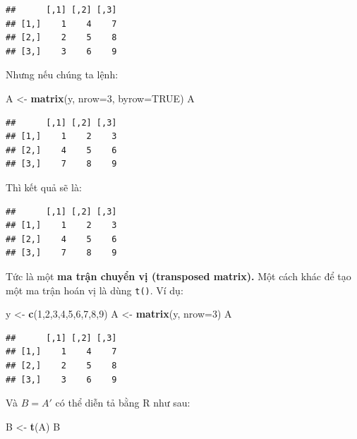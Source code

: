 \documentclass[
]{book}
\newenvironment{Shaded}{\begin{snugshade}}{\end{snugshade}}
\newcommand{\DataTypeTok}[1]{\textcolor[rgb]{0.13,0.29,0.53}{#1}}
\newcommand{\DecValTok}[1]{\textcolor[rgb]{0.00,0.00,0.81}{#1}}
\newcommand{\KeywordTok}[1]{\textcolor[rgb]{0.13,0.29,0.53}{\textbf{#1}}}
\newcommand{\NormalTok}[1]{#1}
\newcommand{\OtherTok}[1]{\textcolor[rgb]{0.56,0.35,0.01}{#1}}
\newcommand{\StringTok}[1]{\textcolor[rgb]{0.31,0.60,0.02}{#1}}
\begin{document}
\begin{verbatim}
##      [,1] [,2] [,3]
## [1,]    1    4    7
## [2,]    2    5    8
## [3,]    3    6    9
\end{verbatim}

Nhưng nếu chúng ta lệnh:

\begin{Shaded}
\begin{Highlighting}[]
\NormalTok{A \textless{}{-}}\StringTok{ }\KeywordTok{matrix}\NormalTok{(y, }\DataTypeTok{nrow=}\DecValTok{3}\NormalTok{, }\DataTypeTok{byrow=}\OtherTok{TRUE}\NormalTok{)}
\NormalTok{A}
\end{Highlighting}
\end{Shaded}

\begin{verbatim}
##      [,1] [,2] [,3]
## [1,]    1    2    3
## [2,]    4    5    6
## [3,]    7    8    9
\end{verbatim}

Thì kết quả sẽ là:

\begin{verbatim}
##      [,1] [,2] [,3]
## [1,]    1    2    3
## [2,]    4    5    6
## [3,]    7    8    9
\end{verbatim}

Tức là một \textbf{ma trận chuyển vị (transposed matrix).} Một cách khác để tạo một ma trận hoán vị là dùng \texttt{t()}. Ví dụ:

\begin{Shaded}
\begin{Highlighting}[]
\NormalTok{y \textless{}{-}}\StringTok{ }\KeywordTok{c}\NormalTok{(}\DecValTok{1}\NormalTok{,}\DecValTok{2}\NormalTok{,}\DecValTok{3}\NormalTok{,}\DecValTok{4}\NormalTok{,}\DecValTok{5}\NormalTok{,}\DecValTok{6}\NormalTok{,}\DecValTok{7}\NormalTok{,}\DecValTok{8}\NormalTok{,}\DecValTok{9}\NormalTok{)}
\NormalTok{A \textless{}{-}}\StringTok{ }\KeywordTok{matrix}\NormalTok{(y, }\DataTypeTok{nrow=}\DecValTok{3}\NormalTok{)}
\NormalTok{A}
\end{Highlighting}
\end{Shaded}

\begin{verbatim}
##      [,1] [,2] [,3]
## [1,]    1    4    7
## [2,]    2    5    8
## [3,]    3    6    9
\end{verbatim}

Và \(B = A'\) có thể diễn tả bằng R như sau:

\begin{Shaded}
\begin{Highlighting}[]
\NormalTok{B \textless{}{-}}\StringTok{ }\KeywordTok{t}\NormalTok{(A)}
\NormalTok{B}
\end{Highlighting}
\end{Shaded}
\end{document}
